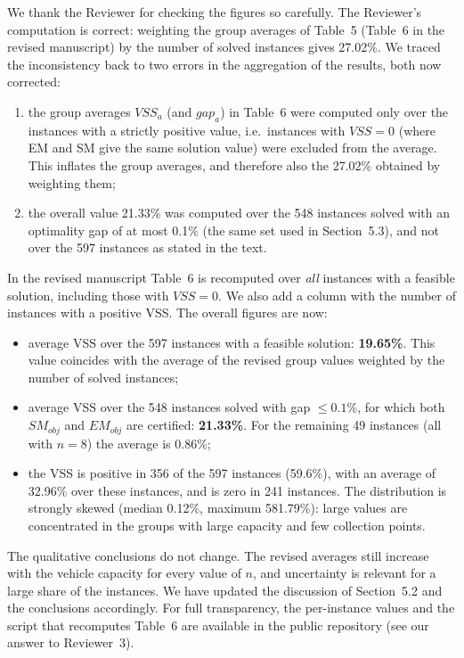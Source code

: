 \documentclass[11pt,a4paper]{article}
\begin{document}
We thank the Reviewer for checking the figures so carefully. The Reviewer's computation is correct: weighting the group averages of Table~5 (Table~6 in the revised manuscript) by the number of solved instances gives 27.02\%. We traced the inconsistency back to two errors in the aggregation of the results, both now corrected:
\begin{enumerate}[leftmargin=*]
\item the group averages $VSS_a$ (and $gap_a$) in Table~6 were computed only over the instances with a strictly positive value, i.e.\ instances with $VSS=0$ (where EM and SM give the same solution value) were excluded from the average. This inflates the group averages, and therefore also the 27.02\% obtained by weighting them;
\item the overall value 21.33\% was computed over the 548 instances solved with an optimality gap of at most 0.1\% (the same set used in Section~5.3), and not over the 597 instances as stated in the text.
\end{enumerate}
In the revised manuscript Table~6 is recomputed over \emph{all} instances with a feasible solution, including those with $VSS=0$. We also add a column with the number of instances with a positive VSS. The overall figures are now:
\begin{itemize}[leftmargin=*]
\item average VSS over the 597 instances with a feasible solution: \textbf{19.65\%}. This value coincides with the average of the revised group values weighted by the number of solved instances;
\item average VSS over the 548 instances solved with gap $\le 0.1\%$, for which both $SM_{obj}$ and $EM_{obj}$ are certified: \textbf{21.33\%}. For the remaining 49 instances (all with $n=8$) the average is 0.86\%;
\item the VSS is positive in 356 of the 597 instances (59.6\%), with an average of 32.96\% over these instances, and is zero in 241 instances. The distribution is strongly skewed (median 0.12\%, maximum 581.79\%): large values are concentrated in the groups with large capacity and few collection points.
\end{itemize}
The qualitative conclusions do not change. The revised averages still increase with the vehicle capacity for every value of $n$, and uncertainty is relevant for a large share of the instances. We have updated the discussion of Section~5.2 and the conclusions accordingly. For full transparency, the per-instance values and the script that recomputes Table~6 are available in the public repository (see our answer to Reviewer~3).
\end{document}

